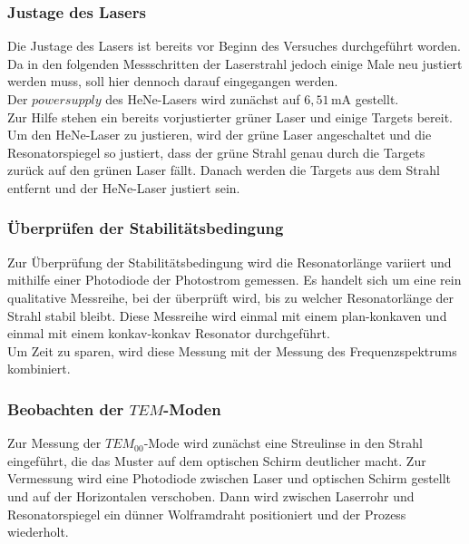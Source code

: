 \subsubsection{Justage des Lasers}

Die Justage des Lasers ist bereits vor Beginn des Versuches durchgeführt worden.
Da in den folgenden Messschritten der Laserstrahl jedoch einige Male neu justiert werden muss, soll hier dennoch darauf eingegangen werden. \\

Der $power supply$ des HeNe-Lasers wird zunächst auf $6,51 \,\unit{\milli\ampere}$ gestellt. \\ %
Zur Hilfe stehen ein bereits vorjustierter grüner Laser und einige Targets bereit.
Um den HeNe-Laser zu justieren, wird der grüne Laser angeschaltet und die Resonatorspiegel so justiert, dass der grüne Strahl genau durch die Targets zurück auf den grünen Laser fällt.
Danach werden die Targets aus dem Strahl entfernt und der HeNe-Laser justiert sein.

\subsubsection{Überprüfen der Stabilitätsbedingung}

Zur Überprüfung der Stabilitätsbedingung wird die Resonatorlänge variiert und mithilfe einer Photodiode der Photostrom gemessen. Es handelt sich um eine rein qualitative Messreihe, bei der überprüft wird,
bis zu welcher Resonatorlänge der Strahl stabil bleibt. 
Diese Messreihe wird einmal mit einem plan-konkaven und einmal mit einem konkav-konkav Resonator durchgeführt. \\

Um Zeit zu sparen, wird diese Messung mit der Messung des Frequenzspektrums kombiniert.


\subsubsection{Beobachten der $TEM$-Moden}

Zur Messung der $TEM_{00}$-Mode wird zunächst eine Streulinse in den Strahl eingeführt, die das Muster auf dem optischen Schirm deutlicher macht.
Zur Vermessung wird eine Photodiode zwischen Laser und optischen Schirm gestellt und auf der Horizontalen verschoben.
Dann wird zwischen Laserrohr und Resonatorspiegel ein dünner Wolframdraht positioniert und der Prozess wiederholt.


